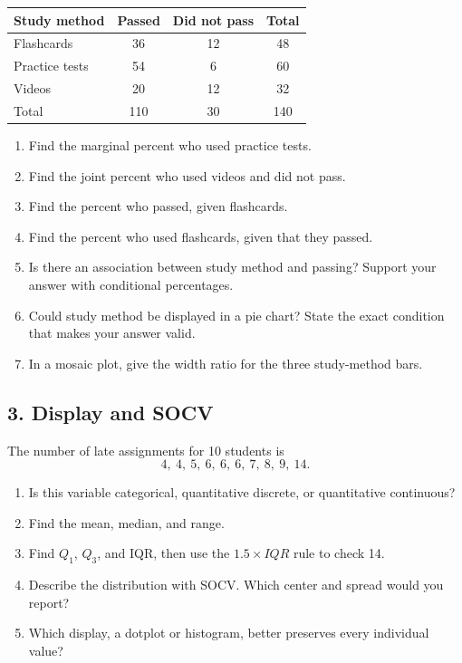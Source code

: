 \documentclass[11pt]{article}
\newcommand{\longwork}{\vspace{0.55in}\hrulefill}
\begin{document}
\begin{center}
\begin{tabular}{l|cc|c}
Study method & Passed & Did not pass & Total\\ \hline
Flashcards & 36 & 12 & 48\\
Practice tests & 54 & 6 & 60\\
Videos & 20 & 12 & 32\\ \hline
Total & 110 & 30 & 140
\end{tabular}
\end{center}

\begin{enumerate}[label=\alph*.]
  \item Find the marginal percent who used practice tests.
  \item Find the joint percent who used videos and did not pass.
  \item Find the percent who passed, given flashcards.
  \item Find the percent who used flashcards, given that they passed.
  \item Is there an association between study method and passing? Support your answer with conditional percentages.
  \item Could study method be displayed in a pie chart? State the exact condition that makes your answer valid.
  \item In a mosaic plot, give the width ratio for the three study-method bars.
\end{enumerate}
\longwork

\newpage
\subsection*{3. Display and SOCV}
The number of late assignments for 10 students is
\[
4,\ 4,\ 5,\ 6,\ 6,\ 6,\ 7,\ 8,\ 9,\ 14.
\]

\begin{enumerate}[label=\alph*.]
  \item Is this variable categorical, quantitative discrete, or quantitative continuous?
  \item Find the mean, median, and range.
  \item Find $Q_1$, $Q_3$, and IQR, then use the $1.5\times IQR$ rule to check 14.
  \item Describe the distribution with SOCV. Which center and spread would you report?
  \item Which display, a dotplot or histogram, better preserves every individual value?
\end{enumerate}
\longwork
\end{document}
